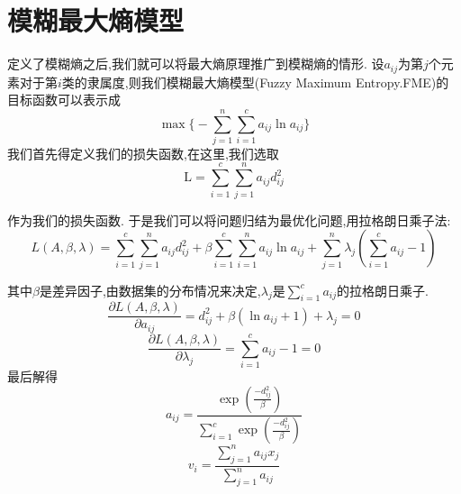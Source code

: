 \newpage
\section{模糊最大熵模型}
定义了模糊熵之后,我们就可以将最大熵原理推广到模糊熵的情形.
设$a_{i j}$为第$j$个元素对于第$i$类的隶属度,则我们模糊最大熵模型(Fuzzy Maximum Entropy.FME)的目标函数可以表示成
\begin{equation}
    \max \biggl\{-\sum_{j=1}^{n} \sum_{i=1}^{c} a_{i j}\ln a_{i j}\biggr\}
    \label{MEC}
\end{equation}
我们首先得定义我们的损失函数,在这里,我们选取
\begin{equation*}
    \mathrm{L}=\sum_{i=1}^{c} \sum_{j=1}^{n}a_{i j} d_{i j}^2
\end{equation*}

作为我们的损失函数.
于是我们可以将问题归结为最优化问题,用拉格朗日乘子法:
\begin{equation}
    L(A,\beta ,\lambda)=\sum_{i=1}^{c} \sum_{j=1}^{n} a_{i j} d_{i j}^2+\beta \sum_{i=1}^{c} \sum_{i=1}^{n} a_{i j} \ln a_{i j}+\sum_{j=1}^{n} \lambda_{j}\left(\sum_{i=1}^{c} a_{i j}-1\right)
    \label{MLagrange}
\end{equation}

其中$\beta$是差异因子,由数据集的分布情况来决定,$\lambda_j$是$\sum\limits_{i=1}^{c} a_{i j}$的拉格朗日乘子.
\begin{equation}
    \frac{\partial L(A,\beta ,\lambda) }{\partial a_{i j}} =d_{i j}^2+\beta(\ln a_{i j}+1)+\lambda_j=0
\end{equation}
\begin{equation}
    \frac{\partial L(A,\beta ,\lambda)}{\partial \lambda_j}=\sum_{i=1}^{c} a_{i j}-1=0
\end{equation}
最后解得
\begin{equation}
    a_{i j}=\frac{ \exp(\frac{-d_{i j}^2}{\beta})}{\sum\limits_{i=1}^c\exp(\frac{-d_{i j}^2}{\beta})}
    \label{Maij}
\end{equation}
\begin{equation}
    v_i =\frac{\sum\limits_{j=1}^n a_{i j} x_j}{\sum\limits_{j=1}^n a_{i j}}
    \label{Mvij}
\end{equation}
